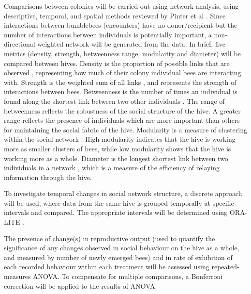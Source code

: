 \documentclass[11pt]{article}
\begin{document}
            Comparisons between colonies will be carried out using network analysis,
            using descriptive, temporal, and spatial methods reviewed by Pinter et al
            \cite{pinter2014dynamics}.
            Since interactions between bumblebees (encounters) have no donor/recipient but the number of interactions between individuals is potentially important, a non-directional weighted network will be generated from the data.
            In brief, five metrics (density, strength, betweenness range, modularity and diameter) will be compared between hives.
            Density is the proportion of possible links that are observed
            \cite{sosa2020network},
            representing how much of their colony individual bees are interacting with.
            Strength is the weighted sum of all links
            \cite{sosa2020network},
            and represents the strength of interactions between bees.
            Betweenness is the number of times an individual is found along the shortest link between two other individuals
            \cite{sosa2020network}.
            The range of betweenness reflects the robustness of the social structure of the hive.
            A greater range reflects the presence of individuals which are more important than others for maintaining the social fabric of the hive.
            Modularity is a measure of clustering within the social network
            \cite{sosa2020network}.
            High modularity indicates that the hive is working more as smaller clusters of bees,
            while low modularity shows that the hive is working more as a whole.
            Diameter is the longest shortest link between two individuals in a network
            \cite{sosa2020network},
            which is a measure of the efficiency of relaying information through the hive.

            To investigate temporal changes in social network structure, a discrete approach will be used,
            where data from the same hive is grouped temporally at specific intervals and compared.
            The appropriate intervals will be determined using ORA-LITE
            \cite{carley2014ora}.

            The presence of change(s) in reproductive output (used to quantify the significance of any changes observed in social behaviour on the hive as a whole, and measured by number of newly emerged bees)
            and in rate of exhibition of each recorded behaviour within each treatment
            will be assessed using repeated-measures ANOVA.
            To compensate for multiple comparisons, a Bonferroni correction will be applied to the results of ANOVA.
        
\end{document}
